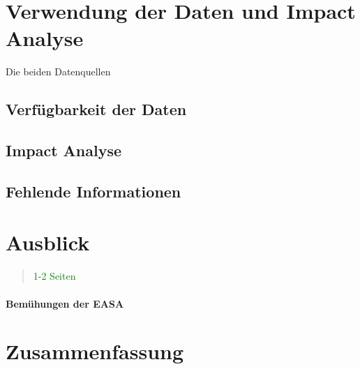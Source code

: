 \chapter{Verwendung der Daten und Impact Analyse}\label{anal}


    Die beiden Datenquellen


    \section{Verfügbarkeit der Daten}
    \section{Impact Analyse}
    \section{Fehlende Informationen}

\chapter{Ausblick}
\begin{quote}
\textcolor{green}{1-2 Seiten}
\end{quote}

\label{ch:ausblick}

\subsubsection{Bemühungen der EASA}

\chapter{Zusammenfassung}


